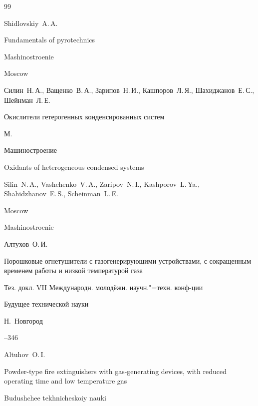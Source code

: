 \begin{thebibliography}{99}

\misctransl

\by Shidlovskiy~A.\,A.

\book Fundamentals of pyrotechnics 

\publ Mashinostroenie

\publaddr Moscow






\by  Силин~Н.\,А.,  Ващенко~В.\,А., Зарипов~Н.\,И., Кашпоров~Л.\,Я., Шахиджанов~Е.\,С., Шейнман~Л.\,Е.

\book Окислители гетерогенных конденсированных систем

\publaddr М.

\publ Машиностроение



\misctransl 

\book Oxidants of heterogeneous condensed systems 

\by Silin~N.\,A., Vashchenko~V.\,A., Zaripov~N.\,I., Kashporov~L.\,Ya., Shahidzhanov~E.\,S., Scheinman~L.\,E.

\publaddr Moscow

\publ Mashinostroenie






\by Алтухов~О.\,И.

\paper Порошковые огнетушители с газогенерирующими устройствами, с сокращенным временем работы и низкой температурой газа

\bookinfo Тез. докл. VII Международн. молодёжн. научн."=техн. конф-ции

\inbook Будущее технической науки 

\publaddr Н.~Новгород


--346

\misctransl 

\by Altuhov~O.\,I.

\paper Powder-type fire extinguishers with gas-generating devices, with reduced operating time and low temperature gas

\inbook Budushchee tekhnicheskoiy nauki


\end{thebibliography}
